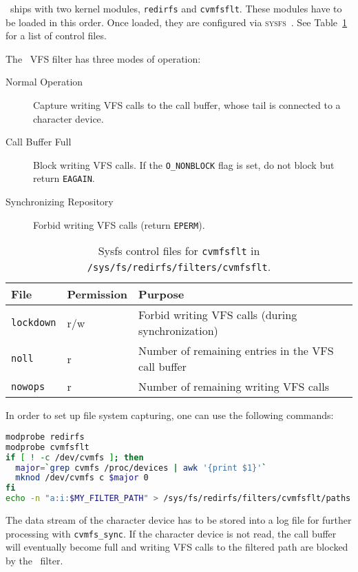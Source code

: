 \cvmfs\ ships with two kernel modules, \texttt{redirfs} and \texttt{cvmfsflt}.
These modules have to be loaded in this order.
Once loaded, they are configured via {\scshape sysfs}~\cite{sysfs05}.
See Table~\ref{tab:sysfs} for a list of control files.

The \cvmfs\ VFS filter has three modes of operation:
\begin{description}
	\item[Normal Operation] Capture writing VFS calls to the call buffer, whose tail is connected to a character device.
	\item[Call Buffer Full] Block writing VFS calls. If the \texttt{O\_NONBLOCK} flag is set, do not block but return \texttt{EAGAIN}.
	\item[Synchronizing Repository] Forbid writing VFS calls (return \texttt{EPERM}).
\end{description}

\begin{table}
	\begin{center}
		\begin{tabularx}{\linewidth}{llX}
			\bf File & \bf Permission & \bf Purpose \\\hline
			\texttt{lockdown} & r/w & Forbid writing VFS calls (during synchronization) \\
			\texttt{noll} & r & Number of remaining entries in the VFS call buffer \\
			\texttt{nowops} & r & Number of remaining writing VFS calls \\
		\end{tabularx}
	\end{center}
	\caption{Sysfs control files for \texttt{cvmfsflt} in \texttt{/sys/fs/redirfs/filters/cvmfsflt}.}
	\label{tab:sysfs}
\end{table}

In order to set up file system capturing, one can use the following commands:
\begin{lstlisting}[language=bash]
modprobe redirfs
modprobe cvmfsflt
if [ ! -c /dev/cvmfs ]; then
  major=`grep cvmfs /proc/devices | awk '{print $1}'`
  mknod /dev/cvmfs c $major 0
fi
echo -n "a:i:$MY_FILTER_PATH" > /sys/fs/redirfs/filters/cvmfsflt/paths
\end{lstlisting}
The data stream of the character device has to be stored into a log file for further processing with \texttt{cvmfs\_sync}.
If the character device is not read, the call buffer will eventually become full and writing VFS calls to the filtered path are blocked by the \cvmfs\ filter.

